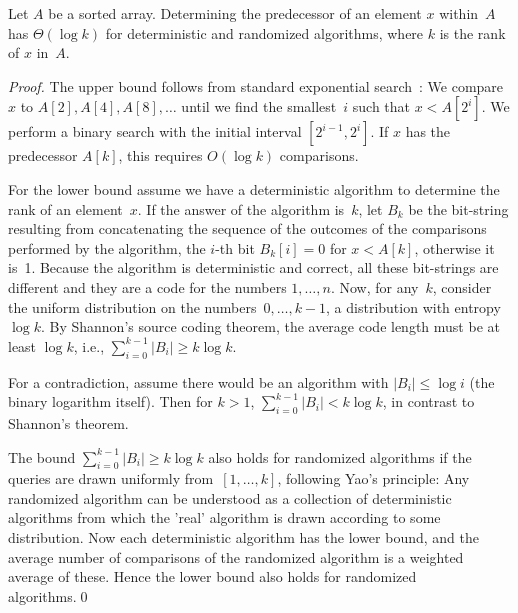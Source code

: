 \begin{theorem}\label{thm:rank}
  Let $A$ be a sorted array.
  Determining the predecessor of an element $x$ within~$A$ has \frag $\Theta(\log k)$ for deterministic and randomized algorithms, where $k$ is the rank of $x$ in~$A$. 
\end{theorem}
\begin{proof}
The upper bound follows from standard exponential
search~\cite{conf/stoc/Fredman75}: We compare~$x$ to
$A[2],A[4],A[8],\ldots$ until we find the smallest~$i$ such that
$x<A[2^i]$.  We perform a binary search with the initial interval
$[2^{i-1},2^i]$.  If $x$ has the predecessor $A[k]$, this requires
$O(\log k)$ comparisons.


For the lower bound assume we have a deterministic algorithm to
determine the rank of an element~$x$.  If the answer of the algorithm
is~$k$, let $B_k$ be the bit-string resulting from concatenating the
sequence of the outcomes of the comparisons performed by the
algorithm, the $i$-th bit $B_k[i]=0$ for $x<A[k]$, otherwise it is~1.
Because the algorithm is deterministic and correct, all these
bit-strings are different and they are a code for the numbers
$1,\ldots,n$.  Now, for any~$k$, consider the uniform distribution on
the numbers~$0,\ldots,k-1$, a distribution with entropy~$\log k$.  By
Shannon's source coding theorem, the average code length must be at
least $\log k$, i.e., $\sum_{i=0}^{k-1} |B_i| \ge k\log k$.

For a contradiction, assume there would be an algorithm with $|B_i|\le \log i$ (the binary logarithm itself). 
Then for $k> 1$, $\sum_{i=0}^{k-1} |B_i| < k\log k$, in contrast to Shannon's theorem.

The bound $\sum_{i=0}^{k-1} |B_i| \ge k\log k$ also holds for randomized algorithms if the queries are drawn uniformly from~$[1,\ldots,k]$, following Yao's principle:
Any randomized algorithm can be understood as a collection of deterministic algorithms from which the 'real' algorithm is drawn according to some distribution. 
Now each deterministic algorithm has the lower bound, and the average number of comparisons of the randomized algorithm is a weighted average of these. 
Hence the lower bound also holds for randomized algorithms.\qed 
\end{proof}
%
